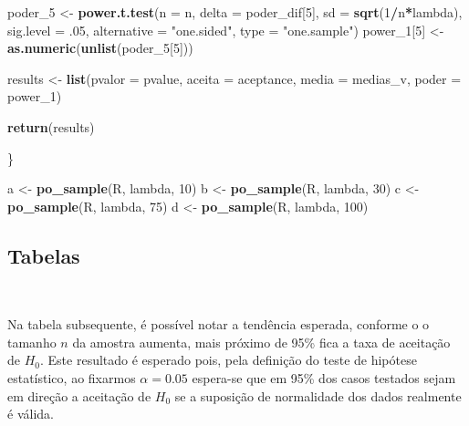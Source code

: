 \documentclass[11pt,]{article}
\newenvironment{Shaded}{\begin{snugshade}}{\end{snugshade}}
\newcommand{\DataTypeTok}[1]{\textcolor[rgb]{0.13,0.29,0.53}{#1}}
\newcommand{\DecValTok}[1]{\textcolor[rgb]{0.00,0.00,0.81}{#1}}
\newcommand{\FloatTok}[1]{\textcolor[rgb]{0.00,0.00,0.81}{#1}}
\newcommand{\KeywordTok}[1]{\textcolor[rgb]{0.13,0.29,0.53}{\textbf{#1}}}
\newcommand{\NormalTok}[1]{#1}
\newcommand{\OperatorTok}[1]{\textcolor[rgb]{0.81,0.36,0.00}{\textbf{#1}}}
\newcommand{\StringTok}[1]{\textcolor[rgb]{0.31,0.60,0.02}{#1}}
\begin{document}
\begin{Shaded}
\begin{Highlighting}[]
\NormalTok{  poder_}\DecValTok{5}\NormalTok{ <-}\StringTok{ }\KeywordTok{power.t.test}\NormalTok{(}\DataTypeTok{n =}\NormalTok{ n, }\DataTypeTok{delta =}\NormalTok{ poder_dif[}\DecValTok{5}\NormalTok{],}
                          \DataTypeTok{sd =} \KeywordTok{sqrt}\NormalTok{(}\DecValTok{1}\OperatorTok{/}\NormalTok{n}\OperatorTok{*}\NormalTok{lambda),}
                          \DataTypeTok{sig.level =} \FloatTok{.05}\NormalTok{,}
                          \DataTypeTok{alternative =} \StringTok{"one.sided"}\NormalTok{,}
                          \DataTypeTok{type =} \StringTok{"one.sample"}\NormalTok{)}
\NormalTok{  power_}\DecValTok{1}\NormalTok{[}\DecValTok{5}\NormalTok{] <-}\StringTok{ }\KeywordTok{as.numeric}\NormalTok{(}\KeywordTok{unlist}\NormalTok{(poder_}\DecValTok{5}\NormalTok{[}\DecValTok{5}\NormalTok{]))}




\NormalTok{  results <-}\StringTok{ }\KeywordTok{list}\NormalTok{(}\DataTypeTok{pvalor =}\NormalTok{ pvalue, }\DataTypeTok{aceita =}\NormalTok{ aceptance,}
               \DataTypeTok{media =}\NormalTok{ medias_v, }\DataTypeTok{poder =}\NormalTok{ power_}\DecValTok{1}\NormalTok{)}

  \KeywordTok{return}\NormalTok{(results)}

\NormalTok{\}}


\NormalTok{a <-}\StringTok{ }\KeywordTok{po_sample}\NormalTok{(R, lambda, }\DecValTok{10}\NormalTok{)}
\NormalTok{b <-}\StringTok{ }\KeywordTok{po_sample}\NormalTok{(R, lambda, }\DecValTok{30}\NormalTok{)}
\NormalTok{c <-}\StringTok{ }\KeywordTok{po_sample}\NormalTok{(R, lambda, }\DecValTok{75}\NormalTok{)}
\NormalTok{d <-}\StringTok{ }\KeywordTok{po_sample}\NormalTok{(R, lambda, }\DecValTok{100}\NormalTok{)}
\end{Highlighting}
\end{Shaded}

\hypertarget{tabelas}{%
\subsection{Tabelas}\label{tabelas}}

~

Na tabela subsequente, é possível notar a tendência esperada, conforme o
o tamanho \(n\) da amostra aumenta, mais próximo de 95\% fica a taxa de
aceitação de \(H_0\). Este resultado é esperado pois, pela definição do
teste de hipótese estatístico, ao fixarmos \(\alpha = 0.05\) espera-se
que em 95\% dos casos testados sejam em direção a aceitação de \(H_0\)
se a suposição de normalidade dos dados realmente é válida.
\end{document}
